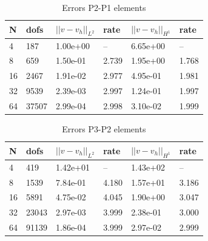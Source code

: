 \begin{table}[!ht]
  \begin{center}
  \begin{tabular}{l | l | l | l | l | l}
    N & dofs &  $||v-v_h||_{L^2}$ & rate & $||v-v_h||_{H^1}$ & rate \\ \hline
     4 &    187 & 1.00e+00 & -- & 6.65e+00 & -- \\ \hline
     8 &    659 & 1.50e-01 & 2.739 & 1.95e+00 & 1.768 \\ \hline
    16 &   2467 & 1.91e-02 & 2.977 & 4.95e-01 & 1.981 \\ \hline
    32 &   9539 & 2.39e-03 & 2.997 & 1.24e-01 & 1.997 \\ \hline
    64 &  37507 & 2.99e-04 & 2.998 & 3.10e-02 & 1.999 \\ \hline
    \hline 
  \end{tabular}
  \caption{Errors P2-P1 elements}
  \end{center}
\end{table}


\begin{table}[!ht]
\begin{center}
  \begin{tabular}{l | l | l | l | l | l}

    N & dofs & $||v-v_h||_{L^2}$ & rate & $||v-v_h||_{H^1}$ & rate \\ \hline
     4 &    419 & 1.42e+01 & -- & 1.43e+02 & -- \\ \hline
     8 &   1539 & 7.84e-01 & 4.180 & 1.57e+01 & 3.186 \\ \hline
    16 &   5891 & 4.75e-02 & 4.045 & 1.90e+00 & 3.047 \\ \hline
    32 &  23043 & 2.97e-03 & 3.999 & 2.38e-01 & 3.000 \\ \hline
    64 &  91139 & 1.86e-04 & 3.999 & 2.97e-02 & 2.999 \\ \hline
    \hline
  \end{tabular}
  \end{center}
  \caption{Errors P3-P2 elements}
\end{table}


